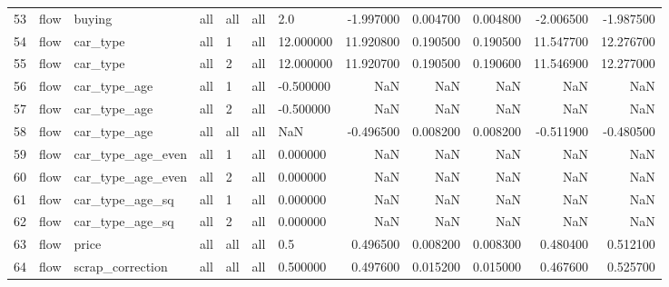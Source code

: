 \begin{tabular}{lllllllrrrrr}
53 & flow & buying & all & all & all & 2.0 & -1.997000 & 0.004700 & 0.004800 & -2.006500 & -1.987500 \\
54 & flow & car_type & all & 1 & all & 12.000000 & 11.920800 & 0.190500 & 0.190500 & 11.547700 & 12.276700 \\
55 & flow & car_type & all & 2 & all & 12.000000 & 11.920700 & 0.190500 & 0.190600 & 11.546900 & 12.277000 \\
56 & flow & car_type_age & all & 1 & all & -0.500000 & NaN & NaN & NaN & NaN & NaN \\
57 & flow & car_type_age & all & 2 & all & -0.500000 & NaN & NaN & NaN & NaN & NaN \\
58 & flow & car_type_age & all & all & all & NaN & -0.496500 & 0.008200 & 0.008200 & -0.511900 & -0.480500 \\
59 & flow & car_type_age_even & all & 1 & all & 0.000000 & NaN & NaN & NaN & NaN & NaN \\
60 & flow & car_type_age_even & all & 2 & all & 0.000000 & NaN & NaN & NaN & NaN & NaN \\
61 & flow & car_type_age_sq & all & 1 & all & 0.000000 & NaN & NaN & NaN & NaN & NaN \\
62 & flow & car_type_age_sq & all & 2 & all & 0.000000 & NaN & NaN & NaN & NaN & NaN \\
63 & flow & price & all & all & all & 0.5 & 0.496500 & 0.008200 & 0.008300 & 0.480400 & 0.512100 \\
64 & flow & scrap_correction & all & all & all & 0.500000 & 0.497600 & 0.015200 & 0.015000 & 0.467600 & 0.525700 \\
\bottomrule
\end{tabular}
